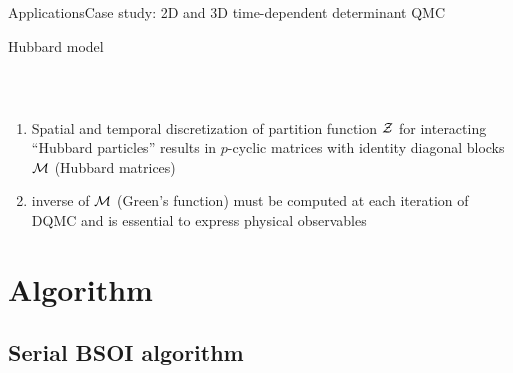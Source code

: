 \documentclass[xcolor=table,final]{beamer} %
\begin{document}
\begin{frame}{Applications}{Case study: %
    2D and 3D time-dependent determinant QMC}
\begin{block}{Hubbard model}
\begin{columns}
\begin{column}{0.7\textwidth}
\begin{equation*}
\begin{split}
          \end{split}
        \end{equation*}
      \end{column}
    \end{columns}
  \end{block}
  \pause
  \begin{enumerate}
  \item 
    \alert{Spatial and temporal discretization} of partition function $\cal Z$
    for interacting ``Hubbard particles''
    results in \alert{$p$-cyclic matrices} with identity diagonal blocks 
    \alert{$\cal M$} (Hubbard matrices)
  \item 
    \alert{inverse of $\cal M$} (Green’s function)
    must be computed \alert{at each iteration} of DQMC
    and is essential to express physical observables
  \end{enumerate} 
\end{frame}

\section{Algorithm}

\subsection{Serial BSOI algorithm}
\end{document}
